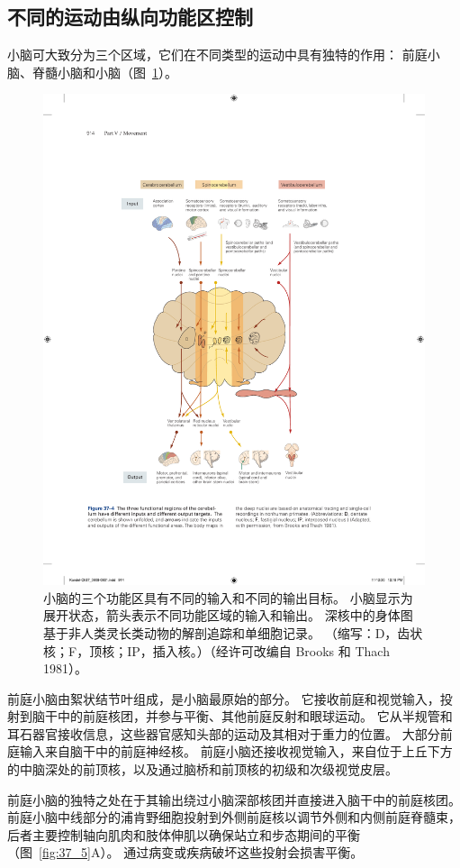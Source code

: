 \subsection{不同的运动由纵向功能区控制}

小脑可大致分为三个区域，它们在不同类型的运动中具有独特的作用：
前庭小脑、脊髓小脑和小脑（图~\ref{fig:37_4}）。


\begin{figure}[htbp]
	\centering
	\includegraphics[width=0.7\linewidth]{chap37/fig_37_4}
	\caption{小脑的三个功能区具有不同的输入和不同的输出目标。 小脑显示为展开状态，箭头表示不同功能区域的输入和输出。 深核中的身体图基于非人类灵长类动物的解剖追踪和单细胞记录。 （缩写：D，齿状核；F，顶核；IP，插入核。）（经许可改编自 Brooks 和 Thach 1981）。}
	\label{fig:37_4}
\end{figure}


前庭小脑由絮状结节叶组成，是小脑最原始的部分。
它接收前庭和视觉输入，投射到脑干中的前庭核团，并参与平衡、其他前庭反射和眼球运动。
它从半规管和耳石器官接收信息，这些器官感知头部的运动及其相对于重力的位置。
大部分前庭输入来自脑干中的前庭神经核。
前庭小脑还接收视觉输入，来自位于上丘下方的中脑深处的前顶核，以及通过脑桥和前顶核的初级和次级视觉皮层。


前庭小脑的独特之处在于其输出绕过小脑深部核团并直接进入脑干中的前庭核团。
前庭小脑中线部分的浦肯野细胞投射到外侧前庭核以调节外侧和内侧前庭脊髓束，后者主要控制轴向肌肉和肢体伸肌以确保站立和步态期间的平衡（图~\ref{fig:37_5}A）。
通过病变或疾病破坏这些投射会损害平衡。


